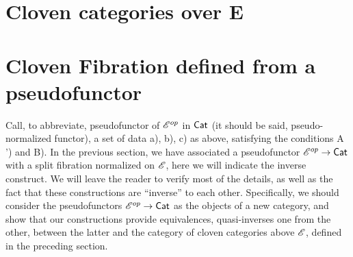 \section{Cloven categories over E}

\section{Cloven Fibration defined from a pseudofunctor}

Call, to abbreviate, pseudofunctor of $\mathscr{E}^{op}$ in $\mathsf{Cat}$ (it should be said, pseudo-normalized functor), a set of data a), b), c) as above, satisfying the conditions A ') and B). 
In the previous section, we have associated a pseudofunctor $\mathscr{E}^{op} \to \mathsf{Cat}$ with a split fibration normalized on $\mathscr{E}$, here we will indicate the inverse construct. 
We will leave the reader to verify most of the details, as well as the fact that these constructions are ``inverse'' to each other. 
Specifically, we should consider the pseudofunctors $\mathscr{E}^{op} \to \mathsf{Cat}$ as the objects of a new category, and show that our constructions provide equivalences, quasi-inverses one from the other, between the latter and the category of cloven categories above $\mathscr{E}$, defined in the preceding section.

